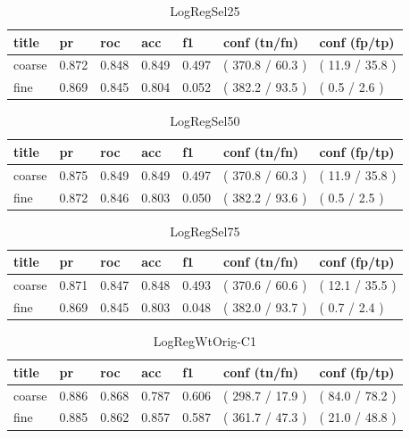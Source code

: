 \documentclass[ms]{nuthesis}
\begin{document}
\FloatBarrier
\begin{table}[H]
\centering
\begin{tabular}{|l||l||l||l||l||l||l|}\toprule
title & pr & roc & acc & f1 & conf (tn/fn) & conf (fp/tp) \\ \midrule
coarse & 0.872 & 0.848 & 0.849 & 0.497 & ( 370.8 / 60.3 ) & ( 11.9 / 35.8 ) \\
fine & 0.869 & 0.845 & 0.804 & 0.052 & ( 382.2 / 93.5 ) & ( 0.5 / 2.6 ) \\ \bottomrule
\end{tabular}
\caption{LogRegSel25}
\label{tab:LogRegSel25}
\end{table}
\FloatBarrier


\FloatBarrier
\begin{table}[H]
\centering
\begin{tabular}{|l||l||l||l||l||l||l|}\toprule
title & pr & roc & acc & f1 & conf (tn/fn) & conf (fp/tp) \\ \midrule
coarse & 0.875 & 0.849 & 0.849 & 0.497 & ( 370.8 / 60.3 ) & ( 11.9 / 35.8 ) \\
fine & 0.872 & 0.846 & 0.803 & 0.050 & ( 382.2 / 93.6 ) & ( 0.5 / 2.5 ) \\ \bottomrule
\end{tabular}
\caption{LogRegSel50}
\label{tab:LogRegSel50}
\end{table}
\FloatBarrier

\FloatBarrier
\begin{table}[H]
\centering
\begin{tabular}{|l||l||l||l||l||l||l|}\toprule
title & pr & roc & acc & f1 & conf (tn/fn) & conf (fp/tp) \\ \midrule
coarse & 0.871 & 0.847 & 0.848 & 0.493 & ( 370.6 / 60.6 ) & ( 12.1 / 35.5 ) \\
fine & 0.869 & 0.845 & 0.803 & 0.048 & ( 382.0 / 93.7 ) & ( 0.7 / 2.4 ) \\ \bottomrule
\end{tabular}
\caption{LogRegSel75}
\label{tab:LogRegSel75}
\end{table}
\FloatBarrier


\FloatBarrier
\begin{table}[H]
\centering
\begin{tabular}{|l||l||l||l||l||l||l|}\toprule
title & pr & roc & acc & f1 & conf (tn/fn) & conf (fp/tp) \\ \midrule
coarse & 0.886 & 0.868 & 0.787 & 0.606 & ( 298.7 / 17.9 ) & ( 84.0 / 78.2 ) \\
fine & 0.885 & 0.862 & 0.857 & 0.587 & ( 361.7 / 47.3 ) & ( 21.0 / 48.8 ) \\ \bottomrule
\end{tabular}
\caption{LogRegWtOrig-C1}
\label{tab:LogRegWtOrig-C1}
\end{table}
\FloatBarrier
\end{document}
